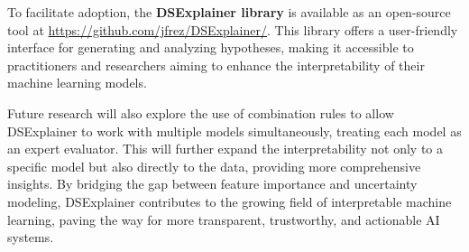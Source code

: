 \documentclass[acmlarge]{acmart}
\begin{document}
To facilitate adoption, the \textbf{DSExplainer library} is available as an open-source tool at \url{https://github.com/jfrez/DSExplainer/}. This library offers a user-friendly interface for generating and analyzing hypotheses, making it accessible to practitioners and researchers aiming to enhance the interpretability of their machine learning models.

Future research will also explore the use of combination rules to allow DSExplainer to work with multiple models simultaneously, treating each model as an expert evaluator. This will further expand the interpretability not only to a specific model but also directly to the data, providing more comprehensive insights. By bridging the gap between feature importance and uncertainty modeling, DSExplainer contributes to the growing field of interpretable machine learning, paving the way for more transparent, trustworthy, and actionable AI systems.







\end{document}
